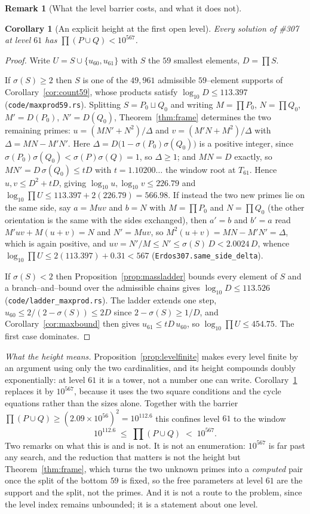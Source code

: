 \documentclass[11pt]{article}
\newtheorem{corollary}[theorem]{Corollary}
\theoremstyle{definition}
\newtheorem{remark}[theorem]{Remark}
\begin{document}
\begin{remark}[What the level barrier costs, and what it does not]
\begin{corollary}[An explicit height at the first open level]\label{cor:level61height}
Every solution of \#307 at level $61$ has $\prod(P\cup Q)<10^{567}$.
\end{corollary}
\begin{proof}
Write $U=S\cup\{u_{60},u_{61}\}$ with $S$ the $59$ smallest elements, $D=\prod S$.

If $\sigma(S)\ge2$ then $S$ is one of the $49{,}961$ admissible $59$--element supports of
Corollary~\ref{cor:count59}, whose products satisfy $\log_{10}D\le113.397$
\textup{(\texttt{code/maxprod59.rs})}. Splitting $S=P_0\sqcup Q_0$ and writing $M=\prod P_0$,
$N=\prod Q_0$, $M'=D(P_0)$, $N'=D(Q_0)$, Theorem~\ref{thm:frame} determines the two remaining primes:
$u=(MN'+N^2)/\Delta$ and $v=(M'N+M^2)/\Delta$ with $\Delta=MN-M'N'$. Here
$\Delta=D\bigl(1-\sigma(P_0)\sigma(Q_0)\bigr)$ is a positive integer, since
$\sigma(P_0)\sigma(Q_0)<\sigma(P)\sigma(Q)=1$, so $\Delta\ge1$; and $MN=D$ exactly, so
$MN'=D\,\sigma(Q_0)\le tD$ with $t=1.10200\ldots$ the window root at $T_{61}$. Hence
$u,v\le D^2+tD$, giving $\log_{10}u,\log_{10}v\le226.79$ and
$\log_{10}\prod U\le113.397+2(226.79)=566.98$.
If instead the two new primes lie on the same side, say $a=Muv$ and $b=N$ with $M=\prod P_0$ and $N=\prod Q_0$ (the other
orientation is the same with the sides exchanged), then $a'=b$ and $b'=a$ read $M'uv+M(u+v)=N$ and $N'=Muv$, so
$M^2(u+v)=MN-M'N'=\Delta$, which is again positive, and $uv=N'/M\le N'\le\sigma(S)\,D<2.0024\,D$, whence
$\log_{10}\prod U\le2(113.397)+0.31<567$ \textup{(}\texttt{Erdos307.same\_side\_delta}\textup{)}.

If $\sigma(S)<2$ then Proposition~\ref{prop:massladder} bounds every element of $S$ and a
branch--and--bound over the admissible chains gives $\log_{10}D\le113.526$
\textup{(\texttt{code/ladder\_maxprod.rs})}. The ladder extends one step, $u_{60}\le2/(2-\sigma(S))\le2D$
since $2-\sigma(S)\ge1/D$, and Corollary~\ref{cor:maxbound} then gives $u_{61}\le tD\,u_{60}$, so
$\log_{10}\prod U\le454.75$. The first case dominates.
\end{proof}

\emph{What the height means.} Proposition~\ref{prop:levelfinite} makes every level finite by an argument using only the two
cardinalities, and its height compounds doubly exponentially: at level $61$ it is a tower, not a
number one can write. Corollary~\ref{cor:level61height} replaces it by $10^{567}$, because it uses
the two square conditions and the cycle equations rather than the sizes alone. Together with the
barrier $\prod(P\cup Q)\ge(2.09\times10^{56})^2=10^{112.6}$ this confines level $61$ to the window
\[ 10^{112.6}\;\le\;\prod(P\cup Q)\;<\;10^{567}. \]
Two remarks on what this is and is not. It is not an enumeration: $10^{567}$ is far past any search,
and the reduction that matters is not the height but Theorem~\ref{thm:frame}, which turns the two
unknown primes into a \emph{computed} pair once the split of the bottom $59$ is fixed, so the free
parameters at level $61$ are the support and the split, not the primes. And it is not a route to the
problem, since the level index remains unbounded; it is a statement about one level.



\end{remark}
\end{document}
